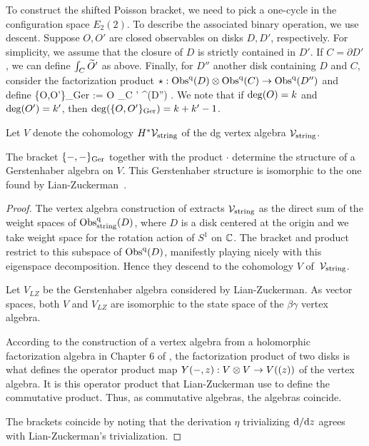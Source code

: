 To construct the shifted Poisson bracket, 
we need to pick a one-cycle in the configuration space $E_2(2)$.
To describe the associated binary operation, we use descent.
Suppose $O,O'$ are closed observables on disks $D,D'$, respectively.
For simplicity, we assume that the closure of $D$ is strictly contained in $D'$. 
If $C = \partial D'$, we can define $\int_C \Tilde{O}'$ as above. 
Finally, for $D''$ another disk containing $D$ and $C$, 
consider the factorization product $\star : \Obs^\q(D) \tensor \Obs^\q (C) \to \Obs^\q(D'')$ and define
\ben
\{O,O'\}_{\rm Ger} := O \star \int_C ' \in \Obs^\q (D'') .
\een 
We note that if ${\rm deg}(O) = k$ and ${\rm deg}(O') = k'$, then ${\rm deg}(\{O,O'\}_{\rm Ger}) = k+k' -1$. 

Let $V$ denote the cohomology $H^* \cV_{\rm string}$ of the dg vertex algebra $\cV_{\rm string}$.

\begin{prop} 
The bracket $\{-,-\}_{\rm Ger}$ together with the product $\cdot$ determine the structure of a Gerstenhaber algebra on $V$. 
This Gerstenhaber structure is isomorphic to the one found by Lian-Zuckerman~\cite{LZ1}.
\end{prop}

\begin{proof}
The vertex algebra construction of \cite{CG1} extracts $\cV_{\rm string}$ as the direct sum of the weight spaces of $\Obs^\q_{\rm string}(D)$, 
where $D$ is a disk centered at the origin and we take weight space for the rotation action of $S^1$ on $\CC$.
The bracket and product restrict to this subspace of $\Obs^\q(D)$,
manifestly playing nicely with this eigenspace decomposition. 
Hence they descend to the cohomology $V$ of~$\cV_{\rm string}$.

Let $V_{LZ}$ be the Gerstenhaber algebra considered by Lian-Zuckerman.
As vector spaces, both $V$ and $V_{LZ}$ are isomorphic to the state space of the $\beta\gamma$ vertex algebra.

According to the construction of a vertex algebra from a holomorphic factorization algebra in Chapter 6 of \cite{CG1}, the factorization product of two disks is what defines the operator product map $Y(-,z) : V \tensor V \to V ((z))$ of the vertex algebra.
It is this operator product that Lian-Zuckerman use to define the commutative product.
Thus, as commutative algebras, the algebras coincide. 

The brackets coincide by noting that the derivation $\eta$ trivializing $\d / \d z$ agrees with Lian-Zuckerman's trivialization.
\end{proof}


